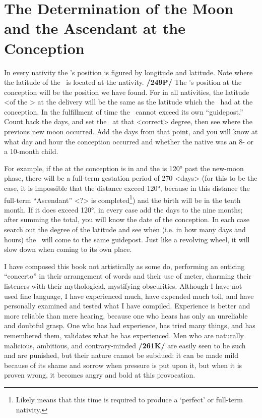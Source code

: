 \section{The Determination of the Moon and the Ascendant at the Conception}

In every nativity the \Moon’s position is figured by longitude and latitude. Note where the latitude of the \Moon\, is located at the nativity. \textbf{/249P/} The \Moon’s position at the conception will be the position we have found. For in all nativities, the latitude <of the \Moon> at the delivery will be the same as the latitude which the \Moon\, had at the conception. In the fulfillment of time the \Moon\, cannot exceed its own “guidepost.” Count back the days, and set the \Moon\, at that <correct> degree, then see where the previous new moon occurred. Add the days from that point, and you will know at what day and hour the conception occurred and whether the native was an 8- or a 10-month child.

For example, if the \Sun\xspace at the conception is in \Aries\xspace and the \Moon\xspace is 120° past the new-moon phase, there will be a full-term gestation period of 270 <days> (for this to be the case, it is impossible that the distance exceed 120°, because in this distance the full-term “Ascendant” <?> is completed\footnote{Likely means that this time is required to produce a `perfect' or full-term nativity.}) and the birth will be in the tenth month. If it does exceed 120°, in every case add the days to the nine months; after summing the total, you will know the date of the conception. In each case search out the degree of the latitude and see when (i.e. in how many days and hours) the \Moon\, will come to the same guidepost. Just like a revolving wheel, it will slow down when coming to its own place. 

I have composed this book not artistically as some do, performing an enticing “concerto” in their arrangement of words and their use of meter, charming their listeners with their mythological, mystifying
obscurities. Although I have not used fine language, I have experienced much, have expended much toil, and have personally examined and tested what I have compiled. Experience is better and more reliable than mere hearing, because one who hears has only an unreliable and doubtful grasp. One who has had experience, has tried many things, and has remembered them, validates what he has experienced. Men who are naturally malicious, ambitious, and contrary-minded \textbf{/261K/} are easily seen to be such and are punished, but their nature cannot be subdued: it can be made mild because of its shame and sorrow when pressure is put upon it, but when it is proven wrong, it becomes angry and bold at this provocation.

